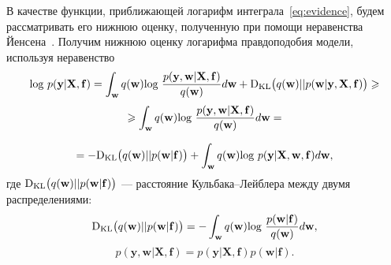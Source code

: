 \documentclass[12pt]{a&t}
\begin{document}



{В качестве функции, приближающей логарифм интеграла~\eqref{eq:evidence}, будем рассматривать его нижнюю оценку, полученную при помощи неравенства Йенсена~\cite{Bishop}. Получим нижнюю оценку логарифма правдоподобия модели, используя неравенство}
\begin{equation} 
\label{eq:elbo}
\textnormal{log}~p(\mathbf{y}|\mathbf{X},\mathbf{f})  = \int_{\mathbf{w}} q(\mathbf{w})\textnormal{log}~\frac{p(\mathbf{y},\mathbf{w}|\mathbf{X},\mathbf{f})}{q(\mathbf{w})}d\mathbf{w} + \textnormal{D}_\textnormal{KL}  \bigl(q(\mathbf{w})||p(\mathbf{w}|\mathbf{y}, \mathbf{X}, \mathbf{f})\bigr) \geq	
\end{equation} 
$$
\geq \int_{\mathbf{w}} q(\mathbf{w})\textnormal{log}~\frac{p(\mathbf{y},\mathbf{w}|\mathbf{X},\mathbf{f})}{q(\mathbf{w})}d\mathbf{w} =
$$

$$
= -\textnormal{D}_\textnormal{KL} \bigl(q(\mathbf{w})||p(\mathbf{w}|\mathbf{f})\bigr) + \int_{\mathbf{w}} q(\mathbf{w})\textnormal{log}~{p(\mathbf{y}|\mathbf{X},\mathbf{w},\mathbf{f})} d \mathbf{w},
$$
где $\textnormal{D}_\textnormal{KL}\bigl(q(\mathbf{w})||p(\mathbf{w} |\mathbf{f})\bigr)$ --- расстояние Кульбака--Лейблера между двумя распределениями: $$\textnormal{D}_\textnormal{KL}\bigl(q(\mathbf{w})||p(\mathbf{w} |\mathbf{f})\bigr) = -\int_{\mathbf{w}} q(\mathbf{w})\textnormal{log}~\frac{p(\mathbf{w} | \mathbf{f})}{q(\mathbf{w})}d\mathbf{w},$$
$$
p(\mathbf{y},\mathbf{w}|\mathbf{X},\mathbf{f}) = p(\mathbf{y}|\mathbf{X},\mathbf{f})p(\mathbf{w}|\mathbf{f}).
$$
\end{document}
